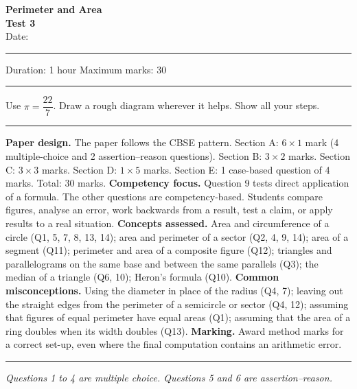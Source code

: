 \begin{center}
{\Large\bfseries Perimeter and Area}\\[3pt]
{\large\bfseries Test 3}\\[5pt]
Date: \rule{3cm}{0.4pt} \quad Duration: 1 hour \quad Maximum marks: 30
\end{center}
\vspace{-6pt}
\noindent\rule{\linewidth}{0.6pt}\par
\vspace{3pt}
{\centering\small Use $\pi=\dfrac{22}{7}$. Draw a rough diagram wherever it helps. Show all your steps.\par}
\ifteacher
\vspace{4pt}
{\color{thinrule}\noindent\rule{\linewidth}{0.4pt}}\par
\vspace{4pt}
{\small\color{muted}\linespread{1.15}\selectfont
\textbf{Paper design.} The paper follows the CBSE pattern. Section A: $6\times1$ mark (4 multiple-choice and 2 assertion--reason questions). Section B: $3\times2$ marks. Section C: $3\times3$ marks. Section D: $1\times5$ marks. Section E: 1 case-based question of 4 marks. Total: 30 marks.\nl
\textbf{Competency focus.} Question 9 tests direct application of a formula. The other questions are competency-based. Students compare figures, analyse an error, work backwards from a result, test a claim, or apply results to a real situation.\nl
\textbf{Concepts assessed.} Area and circumference of a circle (Q1, 5, 7, 8, 13, 14); area and perimeter of a sector (Q2, 4, 9, 14); area of a segment (Q11); perimeter and area of a composite figure (Q12); triangles and parallelograms on the same base and between the same parallels (Q3); the median of a triangle (Q6, 10); Heron's formula (Q10).\nl
\textbf{Common misconceptions.} Using the diameter in place of the radius (Q4, 7); leaving out the straight edges from the perimeter of a semicircle or sector (Q4, 12); assuming that figures of equal perimeter have equal areas (Q1); assuming that the area of a ring doubles when its width doubles (Q13).\nl
\textbf{Marking.} Award method marks for a correct set-up, even where the final computation contains an arithmetic error.\par}
\vspace{4pt}
{\color{thinrule}\noindent\rule{\linewidth}{0.4pt}}\par
\vspace{3pt}
\fi

{\small\itshape Questions 1 to 4 are multiple choice. Questions 5 and 6 are assertion--reason.\par}

